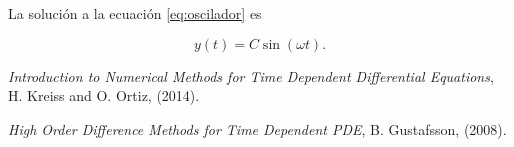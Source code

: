 \documentclass[12pt]{article}
\begin{document}
La soluci\'on a la ecuaci\'on \ref{eq:oscilador} es 

\begin{equation}
y(t) = C \sin(\omega t).
\end{equation}


\begin{thebibliography}{1}

 {\em Introduction to Numerical Methods for Time Dependent Differential Equations}, H. Kreiss and O. Ortiz, (2014).

 {\em High Order Difference Methods for Time Dependent PDE}, B. Gustafsson, (2008).

\end{thebibliography}
\end{document}
